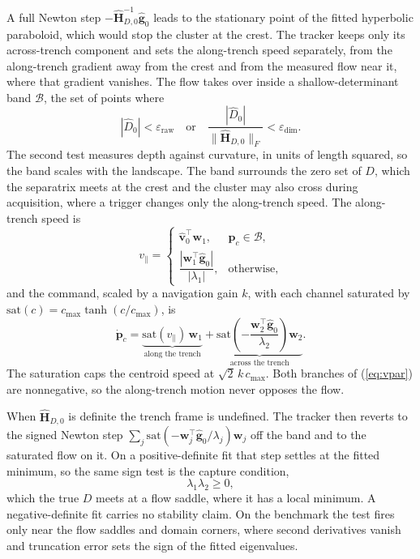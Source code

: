 \documentclass[lettersize,journal]{IEEEtran}
\begin{document}
A full Newton step $-\hat{\mathbf{H}}_{D,0}^{-1}\hat{\mathbf{g}}_0$ leads
to the stationary point of the fitted hyperbolic paraboloid, which would
stop the cluster at the crest. The tracker keeps only its across-trench
component and sets the along-trench speed separately, from the
along-trench gradient away from the crest and from the measured flow near
it, where that gradient vanishes. The flow takes over inside a
shallow-determinant band $\mathcal{B}$, the set of points where
\begin{equation}
    |\hat{D}_0| < \varepsilon_{\mathrm{raw}}
    \quad\text{or}\quad
    \frac{|\hat{D}_0|}{\|\hat{\mathbf{H}}_{D,0}\|_F}
        < \varepsilon_{\dim}.
    \label{eq:band}
\end{equation}
The second test measures depth against curvature, in units of length
squared, so the band scales with the landscape. The band surrounds the
zero set of $D$, which the separatrix meets at the crest and the cluster
may also cross during acquisition, where a trigger changes only the
along-trench speed. The along-trench speed is
\begin{equation}
    v_\parallel =
    \begin{cases}
        \hat{\mathbf{v}}_0^\top \mathbf{w}_1,
            & \mathbf{p}_c \in \mathcal{B}, \\[6pt]
        \dfrac{|\mathbf{w}_1^\top \hat{\mathbf{g}}_0|}{|\lambda_1|},
            & \text{otherwise},
    \end{cases}
    \label{eq:vpar}
\end{equation}
and the command, scaled by a navigation gain $k$, with each channel
saturated by $\mathrm{sat}(c) = c_{\max}\tanh(c/c_{\max})$, is
\begin{equation}
    \dot{\mathbf{p}}_c =
    \underbrace{\mathrm{sat}(v_\parallel)\,\mathbf{w}_1}_{\text{along the trench}}
    + \underbrace{\mathrm{sat}\!\left(-\frac{\mathbf{w}_2^\top
      \hat{\mathbf{g}}_0}{\lambda_2}\right)\mathbf{w}_2}_{\text{across the trench}}.
    \label{eq:d_law}
\end{equation}
The saturation caps the centroid speed at $\sqrt{2}\,k\,c_{\max}$.
Both branches of (\ref{eq:vpar}) are nonnegative, so the along-trench
motion never opposes the flow.

When $\hat{\mathbf{H}}_{D,0}$ is definite the trench frame is undefined.
The tracker then reverts to the signed Newton step
$\sum_j \mathrm{sat}(-\mathbf{w}_j^\top\hat{\mathbf{g}}_0/
\lambda_j)\mathbf{w}_j$ off the band and to the saturated flow on it.
On a positive-definite fit that step settles at the fitted minimum, so
the same sign test is the capture condition,
\begin{equation}
    \lambda_1 \lambda_2 \geq 0,
    \label{eq:d_capture}
\end{equation}
which the true $D$ meets at a flow saddle, where it has a local minimum.
A negative-definite fit carries no stability claim. On the benchmark the
test fires only near the flow saddles and domain corners, where second derivatives vanish and truncation error sets the
sign of the fitted eigenvalues.
\end{document}
